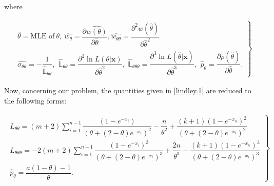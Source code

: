 \documentclass[11pt,a4paper]{article}
\numberwithin{equation}{section}
\begin{document}
	where 

	\begin{align}\label{lindley.1}

		\left.\begin{array}{ll}

			\hat{\theta}= \text{MLE of}~ \theta,~\hat{w_{\theta}}=\dfrac{\partial\hat{ w(\theta)}}{\partial\hat{\theta}},	\hat{w_{\theta\theta}}=\dfrac{\partial^2 w(\hat{\theta})}{\partial \hat{\theta}^2}\\ \hat{\sigma_{\theta\theta}}= -\dfrac{1}{\mathbb{\hat{L}}_{\theta\theta}},\,\

			\mathbb{\hat{L}}_{\theta\theta}= \dfrac{\partial^2 \ln  L(\theta|\boldsymbol{x})}

			{\partial \hat{\theta}^2},\,\,

			\mathbb{\hat{L}}_{\theta\theta\theta}= \dfrac{\partial^3 \ln  L(\hat{\theta}|\boldsymbol{x}) }{\partial \hat{\theta}^3},\,\

			\hat{p}_{{\theta}}=\dfrac{\partial \rho(\hat{\theta})}{\partial \hat{\theta}}.

		\end{array}\right\rbrace

	\end{align}

	

	Now, concerning our problem, the quantities given in \eqref{lindley.1} are reduced to the following forms:

	\begin{align}

		\left.

		\begin{array}{ll}

			L_{\theta \theta}= (m+2)\sum_{i=1}^{n-1}\dfrac{(1-e^{-x_{i}})}{\left(\theta+(2-\theta)e^{-x_{i}}\right)^{2}}-\dfrac{n}{\theta^{2}}+\dfrac{(k+1)(1-e^{-x_{n}})^2}{\left(\theta+(2-\theta)e^{-x_{i}}\right)^{2}}\\

			L_{\theta\theta\theta}= -2(m+2)\sum_{i=1}^{n-1}\dfrac{(1-e^{-x_{i}})^{3}}{\left(\theta+(2-\theta)e^{-x_{i}}\right)^{3}}+\dfrac{2n}{\theta^{3}}-\dfrac{(k+1)(1-e^{-x_{n}})^3}{\left(\theta+(2-\theta)e^{-x_{i}}\right)^{3}}\\

			\hat{p}_{{\theta}}= \dfrac{a(1-\theta)-1}{\theta}.

		\end{array}\right\rbrace

	\end{align}
\end{document}
